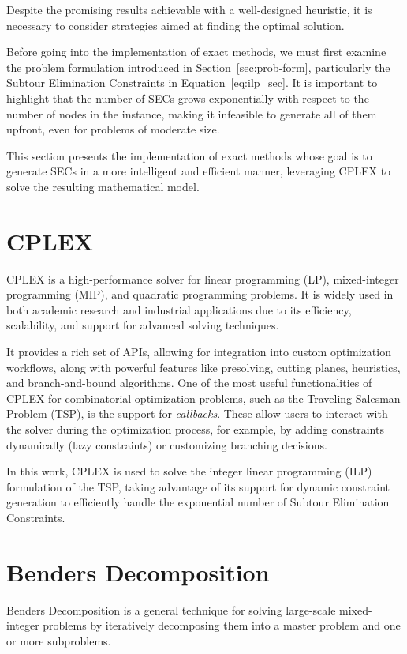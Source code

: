 \label{chap:exact-methods}
Despite the promising results achievable with a well-designed heuristic, it is necessary to consider strategies aimed at finding the optimal solution.

Before going into the implementation of exact methods, we must first examine the problem formulation introduced in Section~\ref{sec:prob-form}, particularly the Subtour Elimination Constraints in Equation~\ref{eq:ilp_sec}. It is important to highlight that the number of SECs grows exponentially with respect to the number of nodes in the instance, making it infeasible to generate all of them upfront, even for problems of moderate size.

This section presents the implementation of exact methods whose goal is to generate SECs in a more intelligent and efficient manner, leveraging CPLEX to solve the resulting mathematical model.

\section{CPLEX}

CPLEX is a high-performance solver for linear programming (LP), mixed-integer programming (MIP), and quadratic programming problems. It is widely used in both academic research and industrial applications due to its efficiency, scalability, and support for advanced solving techniques.

It provides a rich set of APIs, allowing for integration into custom optimization workflows, along with powerful features like presolving, cutting planes, heuristics, and branch-and-bound algorithms. One of the most useful functionalities of CPLEX for combinatorial optimization problems, such as the Traveling Salesman Problem (TSP), is the support for \emph{callbacks}. These allow users to interact with the solver during the optimization process, for example, by adding constraints dynamically (lazy constraints) or customizing branching decisions.

In this work, CPLEX is used to solve the integer linear programming (ILP) formulation of the TSP, taking advantage of its support for dynamic constraint generation to efficiently handle the exponential number of Subtour Elimination Constraints.

\section{Benders Decomposition}

Benders Decomposition is a general technique for solving large-scale mixed-integer problems by iteratively decomposing them into a master problem and one or more subproblems. 

